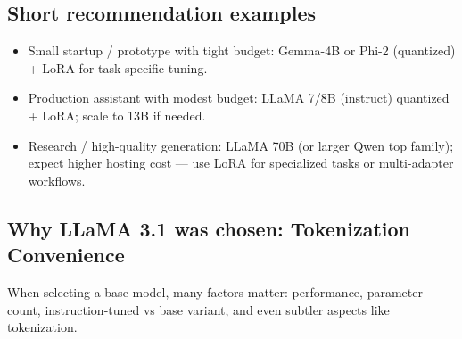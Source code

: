 \subsection{Short recommendation examples}
\begin{itemize}
  \item Small startup / prototype with tight budget: Gemma-4B or Phi-2 (quantized) + LoRA for task-specific tuning.
  \item Production assistant with modest budget: LLaMA 7/8B (instruct) quantized + LoRA; scale to 13B if needed.
  \item Research / high-quality generation: LLaMA 70B (or larger Qwen top family); expect higher hosting cost — use LoRA for specialized tasks or multi-adapter workflows.
\end{itemize}

\newpage
\subsection{Why LLaMA 3.1 was chosen: Tokenization Convenience}

When selecting a base model, many factors matter: performance, parameter count, instruction-tuned vs base variant, and even subtler aspects like tokenization.  

